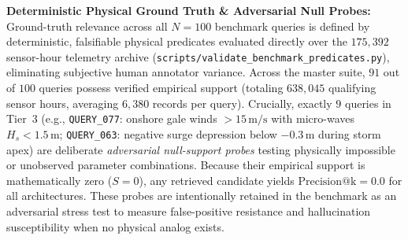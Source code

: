 \documentclass[journal]{IEEEtran}
\begin{document}
\noindent \textbf{Deterministic Physical Ground Truth \& Adversarial Null Probes:}
Ground-truth relevance across all $N = 100$ benchmark queries is defined by deterministic, falsifiable physical predicates evaluated directly over the $175{,}392$ sensor-hour telemetry archive (\texttt{scripts/validate\_benchmark\_predicates.py}), eliminating subjective human annotator variance. Across the master suite, $91$ out of $100$ queries possess verified empirical support (totaling $638{,}045$ qualifying sensor hours, averaging $6{,}380$ records per query). Crucially, exactly $9$ queries in Tier~3 (e.g., \texttt{QUERY\_077}: onshore gale winds $> 15\,\text{m/s}$ with micro-waves $H_s < 1.5\,\text{m}$; \texttt{QUERY\_063}: negative surge depression below $-0.3\,\text{m}$ during storm apex) are deliberate \textit{adversarial null-support probes} testing physically impossible or unobserved parameter combinations. Because their empirical support is mathematically zero ($S = 0$), any retrieved candidate yields $\text{Precision@k} = 0.0$ for all architectures. These probes are intentionally retained in the benchmark as an adversarial stress test to measure false-positive resistance and hallucination susceptibility when no physical analog exists.

\begin{table}[t]
\caption{GRAND 4-WAY INFORMATION RETRIEVAL BENCHMARK ACROSS 100 MULTIMODAL OPERATIONAL \& ADVERSARIAL QUERIES}
\label{tab:grand_benchmark}
\begin{center}
\end{center}
\end{table}
\end{document}
